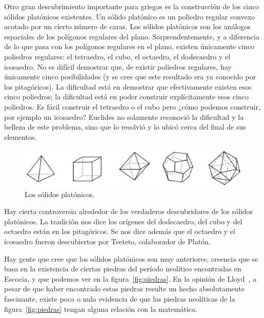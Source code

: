 Otro gran descubrimiento importante para griegos es la construcción de los cinco
sólidos platónicos existentes. Un sólido platónico es un poliedro regular
convexo acotado por un cierto número de caras. Los sólidos platónicos son los
análogos espaciales de los polígonos regulares del plano. Sorprendentemente, y
a diferencia de lo que pasa con los polígonos regulares en el plano, existen
únicamente cinco poliedros regulares: el tetraedro, el cubo, el octaedro, el
dodecaedro y el icosaedro. No es difícil demostrar que, de existir poliedros
regulares, hay únicamente cinco posibilidades (y se cree que este resultado era
ya conocido por los pitagóricos). La dificultad está en demostrar que
efectivamente existen esos cinco poliedros; la dificultad está en poder
construir explícitamente esos cinco poliedros. Es fácil construir el tetraedro
o el cubo pero ¿cómo podemos construir, por ejemplo un icosaedro? Euclides no
solamente reconoció la dificultad y la belleza de este problema, sino que lo
resolvió y lo ubicó cerca del final de sus elementos. 

\begin{figure}
   \centering
   \includegraphics[scale=0.7]{images/platonic}
   \caption{Los sólidos platónicos.}
   \label{fig:platonic}
\end{figure}

Hay cierta controversia alrededor de los verdaderos descubridores de los
sólidos platónicos. La tradición nos dice los orígenes del dodecaedro, del cubo
y del octaedro están en los pitagóricos. Se nos dice además que el octaedro y
el icosaedro fueron descubiertos por Teeteto, colaborador de Platón. 

Hay gente que cree que los sólidos platónicos son muy anteriores,
creencia que se basa en la existencia de ciertas piedras del período neolítico
encontradas en Escocia, y que podemos ver en la figura~\ref{fig:piedras}. En la
opinión de Lloyd~\cite{MR2992714}, a pesar de que haber encontrado estas piedras resulte
un hecho absolutamente fascinante, 
existe poca o nula evidencia de que las piedras neolíticas de la
figura~\ref{fig:piedras} tengan alguna relación con la matemática. 
 
